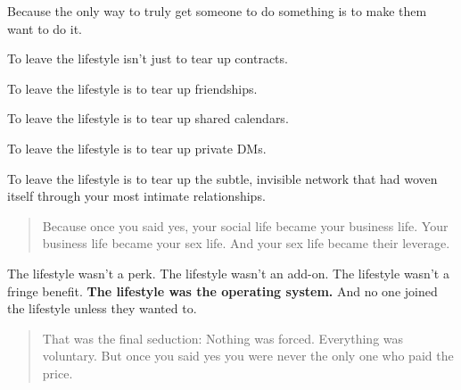 Because the only way to truly get someone to do something is to make them want to do it.

To leave the lifestyle isn’t just to tear up contracts.

To leave the lifestyle is to tear up friendships.  

To leave the lifestyle is to tear up shared calendars.  

To leave the lifestyle is to tear up private DMs.  

To leave the lifestyle is to tear up the subtle, invisible network that had woven itself through your 
most intimate relationships.

\begin{quote}
Because once you said yes,  
your social life became your business life.  
Your business life became your sex life.  
And your sex life became their leverage.
\end{quote}

The lifestyle wasn’t a perk.
The lifestyle wasn’t an add-on.
The lifestyle wasn’t a fringe benefit.
\textbf{The lifestyle was the operating system.}
And no one joined the lifestyle unless they wanted to.

\begin{quote}
That was the final seduction:  
Nothing was forced.  
Everything was voluntary.  
But once you said yes  
you were never the only one who paid the price.
\end{quote}


